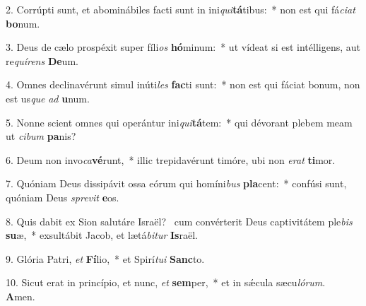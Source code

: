 2. Corrúpti sunt, et abominábiles facti sunt in ini\textit{qui}\textbf{tá}tibus:~*  non est qui fá\textit{ci}\textit{at} \textbf{bo}num.\

3. Deus de cælo prospéxit super fíli\textit{os} \textbf{hó}minum:~*  ut vídeat si est intélligens, aut re\textit{quí}\textit{rens} \textbf{De}um.\

4. Omnes declinavérunt simul inúti\textit{les} \textbf{fac}ti sunt:~*  non est qui fáciat bonum, non est us\textit{que} \textit{ad} \textbf{u}num.\

5. Nonne scient omnes qui operántur ini\textit{qui}\textbf{tá}tem:~*  qui dévorant plebem meam ut \textit{ci}\textit{bum} \textbf{pa}nis?\

6. Deum non invo\textit{ca}\textbf{vé}runt,~*  illic trepidavérunt timóre, ubi non \textit{e}\textit{rat} \textbf{ti}mor.\

7. Quóniam Deus dissipávit ossa eórum qui homíni\textit{bus} \textbf{pla}cent:~*  confúsi sunt, quóniam Deus \textit{spre}\textit{vit} \textbf{e}os.\

8. Quis dabit ex Sion salutáre Israël? \dag\  cum convérterit Deus captivitátem ple\textit{bis} \textbf{su}æ,~*  exsultábit Jacob, et lætá\textit{bi}\textit{tur} \textbf{Is}raël.\

9. Glória Patri, \textit{et} \textbf{Fí}lio,~*  et Spirí\textit{tu}\textit{i} \textbf{Sanc}to.\

10. Sicut erat in princípio, et nunc, \textit{et} \textbf{sem}per,~*  et in sǽcula sæcu\textit{ló}\textit{rum}. \textbf{A}men.\

